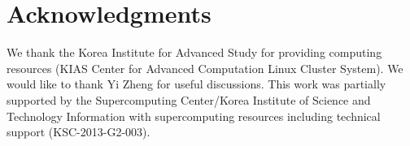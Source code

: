 \documentclass[iop]{emulateapj}
\begin{document}
 
 
\section*{Acknowledgments}

We thank the Korea Institute for Advanced Study for providing computing resources (KIAS Center for Advanced Computation Linux Cluster System).
We would like to thank Yi Zheng for useful discussions.
This work was partially supported by the
Supercomputing Center/Korea Institute of Science and
Technology Information with supercomputing resources
including technical support (KSC-2013-G2-003).

\appendix

\
\end{document}
